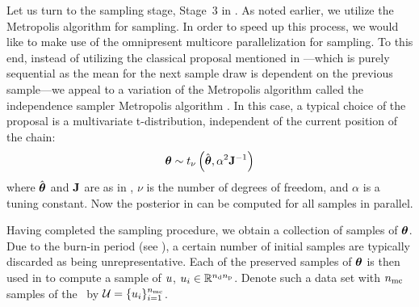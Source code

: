 Let us turn to the sampling stage, Stage~3 in . As noted earlier, we utilize the Metropolis algorithm for sampling. In order to speed up this process, we would like to make use of the omnipresent multicore parallelization for sampling. To this end, instead of utilizing the classical proposal mentioned in ---which is purely sequential as the mean for the next sample draw is dependent on the previous sample---we appeal to a variation of the Metropolis algorithm called the independence sampler Metropolis algorithm \cite{gelman2004}. In this case, a typical choice of the proposal is a multivariate t-distribution, independent of the current position of the chain:
\begin{equation} \elabel{proposal}
  \vparam \sim \studentst{\nu}{\hat{\vparam}}{\alpha^2 \mOI^{-1}}
\end{equation}
where $\hat{{\boldsymbol\theta}}$ and $\mathbf{J}$ are as in , $\nu$ is the number of degrees of freedom, and $\alpha$ is a tuning constant. Now the posterior in  can be computed for all samples in parallel.

Having completed the sampling procedure, we obtain a collection of samples of ${\boldsymbol\theta}$. Due to the burn-in period (see ), a certain number of initial samples are typically discarded as being unrepresentative.
Each of the preserved samples of ${\boldsymbol\theta}$ is then used in  to compute a sample of $u$, $u_i \in \mathbb{R}^{{n_\text{d}} {n_\text{p}}}$.
Denote such a data set with ${n_\text{mc}}$ samples of the \qoi\ by $\mathcal{U} = \{ u_i \}_{i = 1}^{n_\text{mc}}$.
